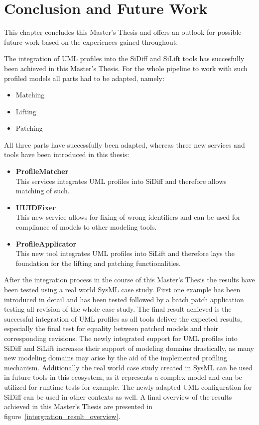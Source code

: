 \chapter{Conclusion and Future Work}\label{conclusionfuturework}
This chapter concludes this Master's Thesis and offers an outlook for possible
future work based on the experiences gained throughout.

The integration of \ac{UML} profiles into the SiDiff and SiLift tools has
succesfully been achieved in this Master's Thesis. For the whole pipeline to
work with such profiled models all parts had to be adapted, namely:
\begin{itemize}
  \item Matching
  \item Lifting
  \item Patching
\end{itemize}
All three parts have successfully been adapted, whereas three new services and
tools have been introduced in this thesis:
\begin{itemize}
  \item \textbf{ProfileMatcher}\\
  		This services integrates \ac{UML} profiles into SiDiff and therefore allows
  		matching of such.
  \item \textbf{\ac{UUID}Fixer}\\
  		This new service allows for fixing of wrong identifiers and can be used for
  		compliance of models to other modeling tools.
  		\newpage
  \item \textbf{ProfileApplicator}\\
  		This new tool integrates \ac{UML} profiles into SiLift and therefore
  		lays the foundation for the lifting and patching functionalities.
\end{itemize}
After
the integration process in the course of this Master's Thesis the results have
been tested using a real world \ac{SysML} case study. First one example has
been introduced in detail and has been tested followed by a batch patch
application testing all revision of the whole case study. The final
result achieved is the successful  integration of \ac{UML} profiles as all tools
deliver the expected results, especially the final test for equality between
patched models and their corresponding revisions. The newly integrated support
for \ac{UML} profiles into SiDiff and SiLift increases their support of modeling
domains drastically, as many new modeling domains may arise by the aid of the
implemented profiling mechanism. Additionally the real world case study
created in \ac{SysML} can be used in future tools in this ecosystem, as it
represents a complex model and can be utilized for runtime tests for example.
The newly adapted \ac{UML} configuration for SiDiff can be used in other
contexts as well. A final overview of the results achieved in this Master's
Thesis are presented in figure~\ref{intergration_result_overview}.

